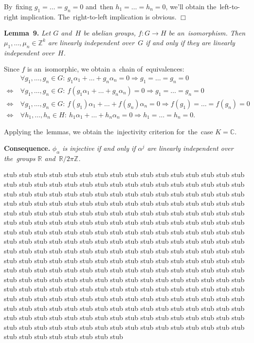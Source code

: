 \documentclass[twoside]{article}
\begin{document}
    By~fixing $g_1 = \ldots = g_n = 0$ and~then $h_1 = \ldots = h_n = 0$, we'll obtain the~left-to-right
    implication. The~right-to-left implication is obvious.
\hfill$\Box$\medskip

\medskip\noindent\textbf{Lemma~9.}\emph{
    Let $G$ and~$H$ be abelian groups, $f : G \rightarrow H$ be an~isomorphism. Then $\mu_1, \ldots, \mu_n \in \mathbb{Z}^k$
    are linearly independent over~$G$ if and only if they are linearly independent over~$H$.
}\medskip

    Since $f$ is an~isomorphic, we obtain a~chain of~equivalences:
    \begin{align*}
                       &\ \forall g_1, \ldots, g_n \in G{:}\ g_1 \alpha_1 + \ldots + g_n \alpha_n = 0 \Rightarrow g_1 = \ldots = g_n = 0 \\
        \Leftrightarrow&\ \forall g_1, \ldots, g_n \in G{:}\ f(g_1 \alpha_1 + \ldots + g_n \alpha_n) = 0 \Rightarrow g_1 = \ldots = g_n = 0 \\
        \Leftrightarrow&\ \forall g_1, \ldots, g_n \in G{:}\ f(g_1) \alpha_1 + \ldots + f(g_n) \alpha_n = 0 \Rightarrow f(g_1) = \ldots = f(g_n) = 0 \\
        \Leftrightarrow&\ \forall h_1, \ldots, h_n \in H{:}\ h_1 \alpha_1 + \ldots + h_n \alpha_n = 0 \Rightarrow h_1 = \ldots = h_n = 0.
        \tag*{$\Box$}
    \end{align*}
{}

Applying the~lemmas, we obtain the~injectivity criterion for~the~case $K = \mathbb{C}$.

\medskip\noindent\textbf{Consequence.}\emph{
    $\phi_\alpha$ is injective if and only if $\alpha^j$ are linearly independent over the~groups $\mathbb{R}$ and~$\mathbb{R} / 2 \pi \mathbb{Z}$.
}\medskip

stub stub stub stub stub stub stub stub stub stub stub stub stub stub stub stub stub stub stub stub stub stub stub stub stub stub stub stub
stub stub stub stub stub stub stub stub stub stub stub stub stub stub stub stub stub stub stub stub stub stub stub stub stub stub stub stub
stub stub stub stub stub stub stub stub stub stub stub stub stub stub stub stub stub stub stub stub stub stub stub stub stub stub stub stub
stub stub stub stub stub stub stub stub stub stub stub stub stub stub stub stub stub stub stub stub stub stub stub stub stub stub stub stub
stub stub stub stub stub stub stub stub stub stub stub stub stub stub stub stub stub stub stub stub stub stub stub stub stub stub stub stub
stub stub stub stub stub stub stub stub stub stub stub stub stub stub stub stub stub stub stub stub stub stub stub stub stub stub stub stub
stub stub stub stub stub stub stub stub stub stub stub stub stub stub stub stub stub stub stub stub stub stub stub stub stub stub stub stub
stub stub stub stub stub stub stub stub stub stub stub stub stub stub stub stub stub stub stub stub stub stub stub stub stub stub stub stub
stub stub stub stub stub stub stub stub stub stub stub stub stub stub stub stub stub stub stub stub stub stub stub stub stub stub stub stub
stub stub stub stub stub stub stub stub stub stub stub stub stub stub stub stub stub stub stub stub stub stub stub stub stub stub stub stub
\end{document}
